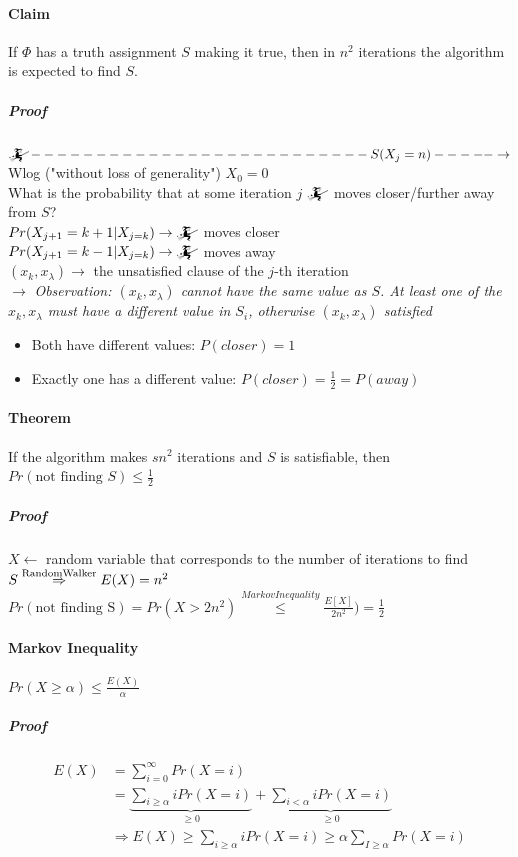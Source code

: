 \paragraph{Claim} If $\Phi$ has a truth assignment $S$ making it true, then in $n^2$ iterations the algorithm is expected to find $S$.
\subparagraph{Proof}$\mathwitch --------------------------S(X_j=n)-----\rightarrow$ \\
Wlog ("without loss of generality") $X_0 = 0$ \\
What is the probability that at some iteration $j$ $\mathwitch$ moves closer/further away from $S$? \\
$Pr(X_{j+1} = k+1|X_{j=k}) \rightarrow \mathwitch$ moves closer \\ 
$Pr(X_{j+1} = k-1|X_{j=k}) \rightarrow \mathwitch$ moves away \\
$(x_k,x_{\lambda}) \rightarrow $ the unsatisfied clause of the $j$-th iteration \\
$\rightarrow$ \textit{Observation: $(x_k,x_{\lambda})$ cannot have the same value as $S$. At least one of the $x_k,x_{\lambda}$ must have a different value in $S_i$, otherwise $(x_k,x_{\lambda})$ satisfied}
\begin{itemize}
	\item Both have different values: $P(closer) = 1$
	\item Exactly one has a different value: $P(closer) = \frac{1}{2} = P(away)$
\end{itemize}
\paragraph{Theorem} If the algorithm makes $sn^2$ iterations and $S$ is satisfiable, then $Pr(\text{not finding }S) \leq \frac{1}{2}$
\subparagraph{Proof} $X \leftarrow$ random variable that corresponds to the number of iterations to find $S \stackrel{\text{Random\\Walker}}{\Rightarrow} E(X) = n^2$ \\
$Pr(\text{not finding S}) = Pr(X > 2n^2) \stackrel{Markov Inequality}{\leq} \frac{E[X]}{2n^2} ) = \frac{1}{2}$ 
\paragraph{Markov Inequality} $Pr(X \geq \alpha) \leq \frac{E(X)}{\alpha}$
\subparagraph{Proof} 
\begin{align*}
	E(X) &= \sum_{i=0}^{\infty}Pr(X=i) \\
	&= \underbrace{\sum_{i\geq\alpha} iPr(X=i)}_{\geq 0} + \underbrace{\sum_{i<\alpha}iPr(X=i)}_{\geq 0} \\
	&\Rightarrow E(X) \geq \sum_{i \geq \alpha}iPr(X=i) \geq \alpha \sum_{I \geq \alpha}Pr(X=i)
\end{align*}
